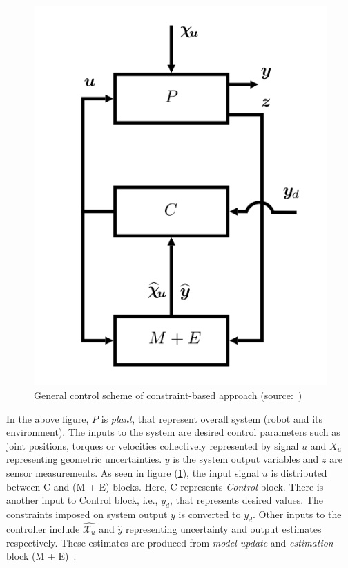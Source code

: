 \begin{figure}[h!]
	\centering
	\includegraphics[scale=0.4]{images/General-control-scheme.png}
	\caption{General control scheme of constraint-based approach (source:~\cite{de2007constraint})}
	\label{fig:control}
\end{figure}

In the above figure, $P$ is \textit{plant}, that represent overall system (robot and its environment). The inputs to the system are desired control parameters such as joint positions, torques or velocities collectively represented by signal $u$ and $X_u$ representing geometric uncertainties. $y$ is the system output variables and $z$ are sensor measurements. As seen in figure (\ref{fig:control}), the input signal $u$ is distributed between C and (M + E) blocks. Here, C represents \textit{Control} block. There is another input to Control block, i.e., $y_d$, that represents desired values. The constraints imposed on system output $y$ is converted to $y_d$. Other inputs to the controller include $\widehat{ \mathcal{X}_u}$ and $\widehat y$ representing uncertainty and output estimates respectively. These estimates are produced from \textit{model update} and \textit{estimation} block (M + E)~\cite{de2007constraint}.

